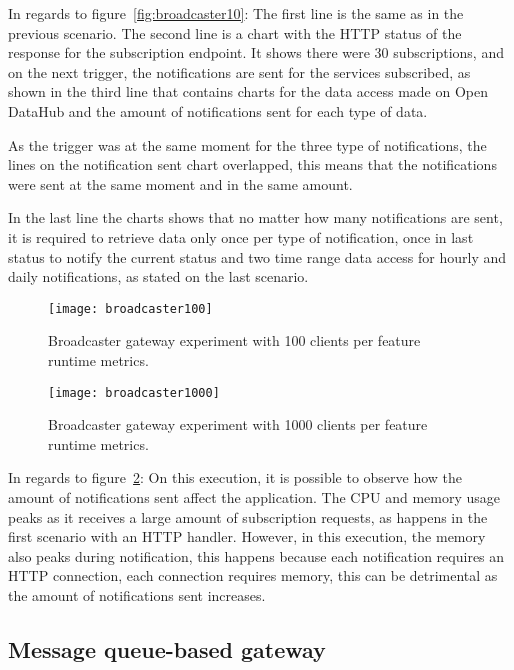 In regards to figure~\ref{fig:broadcaster10}: The first line is the same as in the previous scenario. The second line is a chart with the HTTP status of the response for the subscription endpoint. It shows there were 30 subscriptions, and on the next trigger, the notifications are sent for the services subscribed, as shown in the third line that contains charts for the data access made on Open DataHub and the amount of notifications sent for each type of data.

As the trigger was at the same moment for the three type of notifications, the lines on the notification sent chart overlapped, this means that the notifications were sent at the same moment and in the same amount.

In the last line the charts shows that no matter how many notifications are sent, it is required to retrieve data only once per type of notification, once in last status to notify the current status and two time range data access for hourly and daily notifications, as stated on the last scenario.

\begin{figure}
    \centering
    \texttt{[image: broadcaster100]}
    \caption{Broadcaster gateway experiment with 100 clients per feature runtime metrics.\label{fig:broadcaster100}}
\end{figure}

\begin{figure}
    \centering
    \texttt{[image: broadcaster1000]}
    \caption{Broadcaster gateway experiment with 1000 clients per feature runtime metrics.\label{fig:broadcaster1000}}
\end{figure}

In regards to figure~\ref{fig:broadcaster1000}: On this execution, it is possible to observe how the amount of notifications sent affect the application. The CPU and memory usage peaks as it receives a large amount of subscription requests, as happens in the first scenario with an HTTP handler. However, in this execution, the memory also peaks during notification, this happens because each notification requires an HTTP connection, each connection requires memory, this can be detrimental as the amount of notifications sent increases.

\subsection*{Message queue-based gateway}
\label{sec:messageresult}

